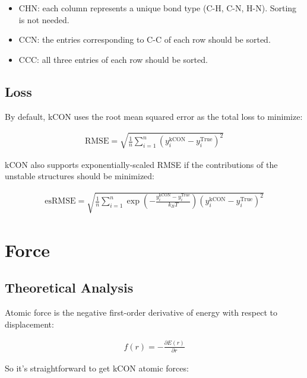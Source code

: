 \documentclass{article}
\begin{document}
\begin{itemize}
	\item CHN: each column represents a unique bond type (C-H, C-N, H-N). Sorting is not needed.
	\item CCN: the entries corresponding to C-C of each row should be sorted.
	\item CCC: all three entries of each row should be sorted.
\end{itemize}

\subsection{Loss}

By default, kCON uses the root mean squared error as the total loss to minimize:

\begin{eqnarray}
\mathrm{RMSE} = \sqrt{
	\frac{1}{n}
	\sum_{i=1}^{n}{ 
		\left( y_{i}^{\mathrm{kCON}} - y_{i}^{\mathrm{True}} \right)^2
	}
}	
\end{eqnarray}

kCON also supports exponentially-scaled RMSE if the contributions of the unstable structures 
should be minimized:

\begin{eqnarray}
\mathrm{esRMSE} = \sqrt{
	\frac{1}{n} 
	\sum_{i=1}^{n}{
		\exp{\left(-\frac{y_{i}^{\mathrm{kCON}} - y_{i}^{\mathrm{True}}}{k_BT} \right)}
		\left(y_{i}^{\mathrm{kCON}} - y_{i}^{\mathrm{True}} \right)^2
	}
}	
\end{eqnarray}

\section{Force}

\subsection{Theoretical Analysis}

Atomic force is the negative first-order derivative of energy with respect to 
displacement:

\begin{eqnarray}
f(r) = -\frac{\partial E(r)}{\partial r}
\end{eqnarray}

\noindent So it's straightforward to get kCON atomic forces:
\end{document}
